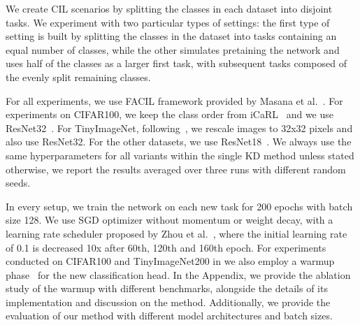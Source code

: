 \documentclass[10pt,twocolumn,letterpaper]{article}
\newcommand\rev[1]{{#1}}
\begin{document}
We create CIL scenarios by splitting the classes in each dataset into disjoint tasks. We experiment with two particular types of settings: the first type of setting is built by splitting the classes in the dataset into tasks containing an equal number of classes, while the other simulates pretaining the network and uses half of the classes as a larger first task, with subsequent tasks composed of the evenly split remaining classes. 

For all experiments, we use FACIL framework provided by Masana et al.~\cite{masana2022class}. For experiments on CIFAR100, we keep the class order from iCaRL~\cite{rebuffi2017icarl} and we use ResNet32~\cite{he2016deep}. \rev{For TinyImageNet, following~\cite{kim2023achieving}, we rescale images to 32x32 pixels and also use ResNet32.} For the other datasets, we use ResNet18~\cite{he2016deep}. We always use the same hyperparameters for all variants within the single KD method unless stated otherwise, we report the results averaged over three runs with different random seeds.

\rev{In every setup, we train the network on each new task for 200 epochs with batch size 128. We use SGD optimizer without momentum or weight decay, with a learning rate scheduler proposed by Zhou et al.~\cite{zhou2023pycil}, where the initial learning rate of 0.1 is decreased 10x after 60th, 120th and 160th epoch. For experiments conducted on CIFAR100 and TinyImageNet200 in \Cref{tab:benchmarks} we also employ a warmup phase~\cite{Kumar2022finetunedistort} for the new classification head. In the Appendix, we provide the ablation study of the warmup with different benchmarks, alongside the details of its implementation and discussion on the method. Additionally, we provide the evaluation of our method with different model architectures and batch sizes.}
\end{document}
